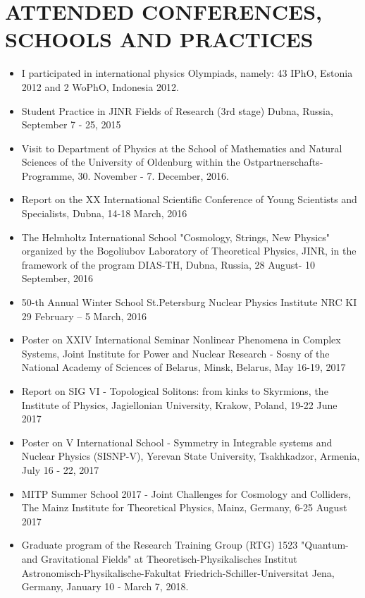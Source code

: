 \documentclass[paper=a4,fontsize=11pt]{scrartcl} %
\newcommand{\NewPart}[1]{\section*{\uppercase{#1}}}
\begin{document}
\NewPart{Attended conferences, schools and practices}
\begin{itemize}
	\item I participated in international physics Olympiads, namely: 43 IPhO, Estonia 2012 and 2 WoPhO, Indonesia 2012.
    \item Student Practice in JINR Fields of Research (3rd stage) Dubna, Russia, September 7 - 25, 2015
    \item Visit to Department of Physics at the School of Mathematics and Natural Sciences of the University of Oldenburg within the Ostpartnerschafts-Programme, 30. November - 7. December, 2016.
    \item Report on the XX International Scientific Conference of Young Scientists and Specialists, Dubna, 14-18 March, 2016
    \item The Helmholtz International School "Cosmology, Strings, New Physics" organized by the Bogoliubov Laboratory of Theoretical Physics, JINR, in the framework of the program DIAS-TH, Dubna, Russia, 28 August- 10 September, 2016
    \item 50-th Annual Winter School St.Petersburg Nuclear Physics Institute NRC KI 29 February – 5 March, 2016
    \item Poster on XXIV International Seminar Nonlinear Phenomena in Complex Systems, Joint Institute for Power and Nuclear Research - Sosny of the National Academy of Sciences of Belarus, Minsk, Belarus, May 16-19, 2017
    \item Report on SIG VI - Topological Solitons: from kinks to Skyrmions, the Institute of Physics, Jagiellonian University, Krakow, Poland, 19-22 June 2017
    \item Poster on V International School - Symmetry in Integrable systems and Nuclear Physics (SISNP-V), Yerevan State University, Tsakhkadzor, Armenia, July 16 - 22, 2017
    \item MITP Summer School 2017 - Joint Challenges for Cosmology and Colliders, The Mainz Institute for Theoretical Physics, Mainz, Germany, 6-25 August 2017
    \item Graduate program of the Research Training
    Group (RTG) 1523 "Quantum- and Gravitational Fields" at
    Theoretisch-Physikalisches Institut Astronomisch-Physikalische-Fakultat
    Friedrich-Schiller-Universitat Jena, Germany, January 10 - March 7, 2018.
\end{itemize}

\renewcommand{\refname}{PUBLICATIONS} %


\end{document}
